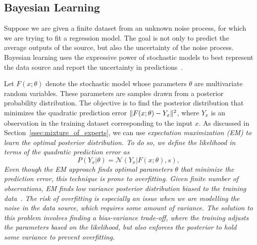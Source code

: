 \subsection{Bayesian Learning}
\label{ssec:bayesianLearning}

Suppose we are given a finite dataset from an unknown noise process, for which
we are trying to fit a regression model.
%
The goal is not only to predict the average outputs of the source, but also
the uncertainty of the noise process.
%
Bayesian learning uses the expressive power of stochastic models to best
represent the data source and report the uncertainty in
predictions~\cite{bishop2006pattern}.


Let $F(x; \theta)$ denote the stochastic model whose parameters $\theta$ are
multivariate random variables.
%
These parameters are samples drawn from a posterior probability distribution.
%
The objective is to find the posterior distribution that minimizes the quadratic
prediction error $\|{F(x; \theta) -  Y_x}\|_{{}_{}}^2$, where $Y_x$ is an observation in
the training dataset corresponding to the input $x$.
%
As discussed in Section~\ref{ssec:mixture_of_experts}, we can use
\it{expectation maximization} \normalfont (EM) to learn the optimal posterior
distribution.
%
To do so, we define the likelihood in terms of the quadratic prediction error as
\begin{equation*}
  P(Y_x | \theta)  = \mathcal{N}(Y_x | F(x; \theta), s),
\end{equation*}
%
Even though the EM approach finds optimal parameters $\theta$ that
minimize the prediction error, this technique is prone to overfitting.
%
Given finite number of observations, EM finds low variance posterior
distribution \it{biased to the training
data}\normalfont~\cite{bishop2006pattern}. 
%
The risk of overfitting is especially an issue when we are modelling the noise
in the data source, which requires some amount of variance.
%
The solution to this problem involves finding a \it{bias-variance
trade-off}\normalfont, where the training adjusts the parameters based on the
likelihood, but also enforces the posterior to hold some variance to prevent
overfitting.
%
